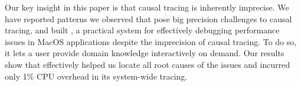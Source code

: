 Our key insight in this paper is that causal tracing is inherently
imprecise. We have reported patterns we observed that pose big precision
challenges to causal tracing, and built \xxx, a practical system for
effectively debugging performance issues in MacOS applications despite the
imprecision of causal tracing.  To do so, it lets a user provide domain
knowledge interactively on demand. Our results show that \xxx effectively
helped us locate all root causes of the issues and incurred only 1\% CPU
overhead in its system-wide tracing.


